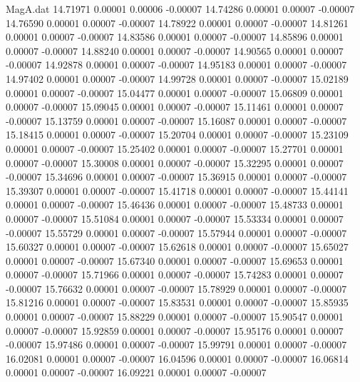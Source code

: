 \begin{filecontents}{MagA.dat}
  14.71971    0.00001    0.00006   -0.00007
  14.74286    0.00001    0.00007   -0.00007
  14.76590    0.00001    0.00007   -0.00007
  14.78922    0.00001    0.00007   -0.00007
  14.81261    0.00001    0.00007   -0.00007
  14.83586    0.00001    0.00007   -0.00007
  14.85896    0.00001    0.00007   -0.00007
  14.88240    0.00001    0.00007   -0.00007
  14.90565    0.00001    0.00007   -0.00007
  14.92878    0.00001    0.00007   -0.00007
  14.95183    0.00001    0.00007   -0.00007
  14.97402    0.00001    0.00007   -0.00007
  14.99728    0.00001    0.00007   -0.00007
  15.02189    0.00001    0.00007   -0.00007
  15.04477    0.00001    0.00007   -0.00007
  15.06809    0.00001    0.00007   -0.00007
  15.09045    0.00001    0.00007   -0.00007
  15.11461    0.00001    0.00007   -0.00007
  15.13759    0.00001    0.00007   -0.00007
  15.16087    0.00001    0.00007   -0.00007
  15.18415    0.00001    0.00007   -0.00007
  15.20704    0.00001    0.00007   -0.00007
  15.23109    0.00001    0.00007   -0.00007
  15.25402    0.00001    0.00007   -0.00007
  15.27701    0.00001    0.00007   -0.00007
  15.30008    0.00001    0.00007   -0.00007
  15.32295    0.00001    0.00007   -0.00007
  15.34696    0.00001    0.00007   -0.00007
  15.36915    0.00001    0.00007   -0.00007
  15.39307    0.00001    0.00007   -0.00007
  15.41718    0.00001    0.00007   -0.00007
  15.44141    0.00001    0.00007   -0.00007
  15.46436    0.00001    0.00007   -0.00007
  15.48733    0.00001    0.00007   -0.00007
  15.51084    0.00001    0.00007   -0.00007
  15.53334    0.00001    0.00007   -0.00007
  15.55729    0.00001    0.00007   -0.00007
  15.57944    0.00001    0.00007   -0.00007
  15.60327    0.00001    0.00007   -0.00007
  15.62618    0.00001    0.00007   -0.00007
  15.65027    0.00001    0.00007   -0.00007
  15.67340    0.00001    0.00007   -0.00007
  15.69653    0.00001    0.00007   -0.00007
  15.71966    0.00001    0.00007   -0.00007
  15.74283    0.00001    0.00007   -0.00007
  15.76632    0.00001    0.00007   -0.00007
  15.78929    0.00001    0.00007   -0.00007
  15.81216    0.00001    0.00007   -0.00007
  15.83531    0.00001    0.00007   -0.00007
  15.85935    0.00001    0.00007   -0.00007
  15.88229    0.00001    0.00007   -0.00007
  15.90547    0.00001    0.00007   -0.00007
  15.92859    0.00001    0.00007   -0.00007
  15.95176    0.00001    0.00007   -0.00007
  15.97486    0.00001    0.00007   -0.00007
  15.99791    0.00001    0.00007   -0.00007
  16.02081    0.00001    0.00007   -0.00007
  16.04596    0.00001    0.00007   -0.00007
  16.06814    0.00001    0.00007   -0.00007
  16.09221    0.00001    0.00007   -0.00007

\end{filecontents}

